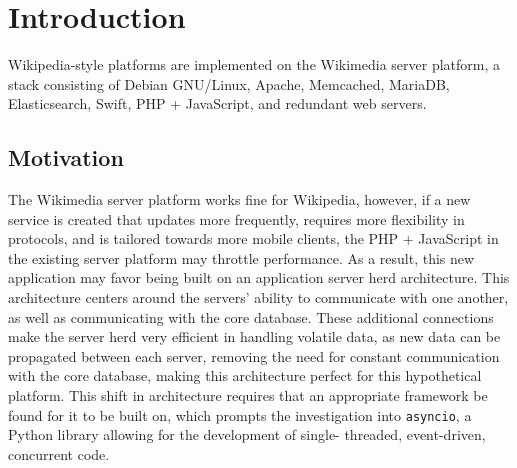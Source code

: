 \section{Introduction}
\par
Wikipedia-style platforms are implemented on the Wikimedia server platform, a
stack consisting of Debian GNU/Linux, Apache, Memcached, MariaDB, Elasticsearch,
Swift, PHP + JavaScript, and redundant web servers. 

\subsection{Motivation}
\par
The Wikimedia server platform works fine for Wikipedia, however, if a new
service is created that updates more frequently, requires more flexibility in
protocols, and is tailored towards more mobile clients, the PHP + JavaScript in
the existing server platform may throttle performance. As a result, this new
application may favor being built on an application server herd architecture.
This architecture centers around the servers' ability to communicate with one
another, as well as communicating with the core database. These additional
connections make the server herd very efficient in handling volatile data, as
new data can be propagated between each server, removing the need for constant
communication with the core database, making this architecture perfect for this
hypothetical platform. This shift in architecture requires that an appropriate
framework be found for it to be built on, which prompts the investigation into
\texttt{asyncio}, a Python library allowing for the development of single-
threaded, event-driven, concurrent code.

